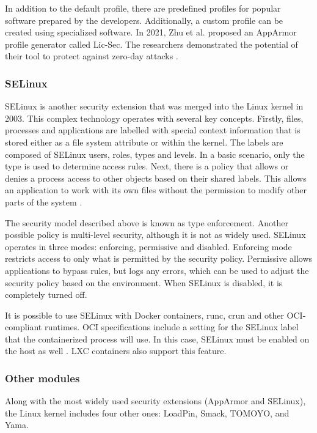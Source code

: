 In addition to the default profile, there are predefined profiles for popular software prepared by the developers. Additionally, a custom profile can be created using specialized software. In 2021, Zhu et al. proposed an AppArmor profile generator called Lic-Sec. The researchers demonstrated the potential of their tool to protect against zero-day attacks \cite{sd:licsec}.

\subsubsection*{SELinux}

SELinux is another security extension that was merged into the Linux kernel in 2003. This complex technology operates with several key concepts. Firstly, files, processes and applications are labelled with special context information that is stored either as a file system attribute or within the kernel. The labels are composed of SELinux users, roles, types and levels. In a basic scenario, only the type is used to determine access rules. Next, there is a policy that allows or denies a process access to other objects based on their shared labels. This allows an application to work with its own files without the permission to modify other parts of the system \cite{c:13}.

The security model described above is known as type enforcement. Another possible policy is multi-level security, although it is not as widely used. SELinux operates in three modes: enforcing, permissive and disabled. Enforcing mode restricts access to only what is permitted by the security policy. Permissive allows applications to bypass rules, but logs any errors, which can be used to adjust the security policy based on the environment. When SELinux is disabled, it is completely turned off.

It is possible to use SELinux with Docker containers, runc, crun and other OCI-compliant runtimes. OCI specifications include a setting for the SELinux label that the containerized process will use. In this case, SELinux must be enabled on the host as well \cite{d:config}. LXC containers also support this feature.

\subsubsection*{Other modules}

Along with the most widely used security extensions (AppArmor and SELinux), the Linux kernel includes four other ones: LoadPin, Smack, TOMOYO, and Yama.

